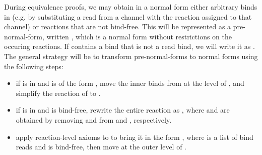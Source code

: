 During equivalence proofs, we may obtain 
in a normal form 
either arbitrary binds in  
(e.g. by substituting a read from a channel with the reaction
assigned to that channel)
or reactions  that are not bind-free.
This will be represented as a pre-normal-form, 
written 
, 
which is a normal form without restrictions on the occuring reactions.
If  contains a bind that is not a read bind, we will write it
as . 
The general strategy will be to transform pre-normal-forms 
to normal forms using the following steps:
\begin{itemize}
\item if  is in  and  is of the form
, move the inner binds from  at the level of , and simplify the reaction of  to .
\item if   is in  and  is bind-free,
rewrite the entire reaction as 
, where  and 
are obtained by removing  and  from  and , respectively.
\item apply reaction-level axioms to  to bring it in the form
, where  is a list of bind reads and  is
bind-free, then move  at the outer level of .
\end{itemize}    

